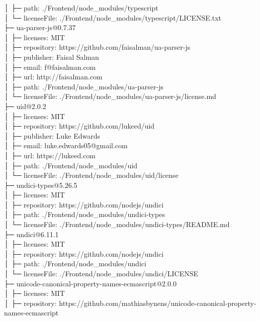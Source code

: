 \documentclass[
    paper=a4,
    twoside=false,
    parskip=half,
    listof=entryprefix,
    listof=totoc,
    index=totoc,
    bibliography=totoc,
    headsepline,
]{scrbook}
\begin{document}
    │  ├─ path: ./Frontend/node\_modules/typescript\\
    │  └─ licenseFile: ./Frontend/node\_modules/typescript/LICENSE.txt\\
    ├─ ua-parser-js@0.7.37\\
    │  ├─ licenses: MIT\\
    │  ├─ repository: https://github.com/faisalman/ua-parser-js\\
    │  ├─ publisher: Faisal Salman\\
    │  ├─ email: f@faisalman.com\\
    │  ├─ url: http://faisalman.com\\
    │  ├─ path: ./Frontend/node\_modules/ua-parser-js\\
    │  └─ licenseFile: ./Frontend/node\_modules/ua-parser-js/license.md\\
    ├─ uid@2.0.2\\
    │  ├─ licenses: MIT\\
    │  ├─ repository: https://github.com/lukeed/uid\\
    │  ├─ publisher: Luke Edwards\\
    │  ├─ email: luke.edwards05@gmail.com\\
    │  ├─ url: https://lukeed.com\\
    │  ├─ path: ./Frontend/node\_modules/uid\\
    │  └─ licenseFile: ./Frontend/node\_modules/uid/license\\
    ├─ undici-types@5.26.5\\
    │  ├─ licenses: MIT\\
    │  ├─ repository: https://github.com/nodejs/undici\\
    │  ├─ path: ./Frontend/node\_modules/undici-types\\
    │  └─ licenseFile: ./Frontend/node\_modules/undici-types/README.md\\
    ├─ undici@6.11.1\\
    │  ├─ licenses: MIT\\
    │  ├─ repository: https://github.com/nodejs/undici\\
    │  ├─ path: ./Frontend/node\_modules/undici\\
    │  └─ licenseFile: ./Frontend/node\_modules/undici/LICENSE\\
    ├─ unicode-canonical-property-names-ecmascript@2.0.0\\
    │  ├─ licenses: MIT\\
    │  ├─ repository: https://github.com/mathiasbynens/unicode-canonical-property-names-ecmascript\\
\end{document}
